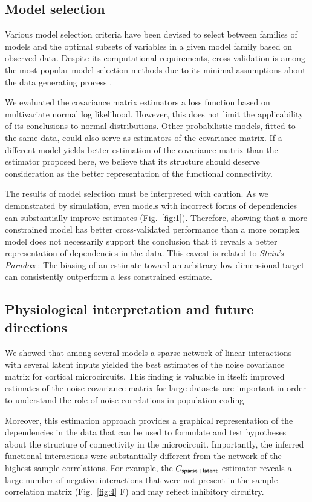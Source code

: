 \subsection*{Model selection}
Various model selection criteria have been devised to select between families of models and the optimal subsets of variables in a given model family based on observed data. Despite its computational requirements, cross-validation is among the most popular model selection methods due to its minimal assumptions about the data generating process \cite{Arlot:2010}.

We evaluated the covariance matrix estimators a loss function based on multivariate normal log likelihood.  However, this does not limit the applicability of its conclusions to normal distributions. Other probabilistic models, fitted to the same data, could also serve as estimators of the covariance matrix.  If a different model yields better estimation of the covariance matrix than the estimator proposed here, we believe that its structure should deserve consideration as the better representation of the functional connectivity.

The results of model selection must be interpreted with caution.  As we demonstrated by simulation, even models with incorrect forms of dependencies can substantially improve estimates (Fig.~\ref{fig:1}). Therefore, showing that a more constrained model has better cross-validated performance than a more complex model does not necessarily support the conclusion that it reveals a better representation of dependencies in the data.  This caveat is related to \emph{Stein's Paradox} \cite{Efron:1977}: The biasing of an estimate toward an arbitrary low-dimensional target can consistently outperform a less constrained estimate.

\subsection*{Physiological interpretation and future directions}

We showed that among several models a sparse network of linear interactions with several latent inputs yielded the best estimates of the noise covariance matrix for cortical microcircuits.  This finding is valuable in itself: improved estimates of the noise covariance matrix for large datasets are important in order to understand the role of noise correlations in population coding \cite{Abbott:1999, Sompolinsky:2001, Averbeck:2006, Ecker:2011}

Moreover, this estimation approach provides a graphical representation of the dependencies in the data that can be used to formulate and test hypotheses about the structure of connectivity in the microcircuit. Importantly, the inferred functional interactions were substantially different from the network of the highest sample correlations.  For example, the $C_{\sf sparse+latent}$ estimator reveals a large number of negative interactions that were not present in the sample correlation matrix (Fig.~\ref{fig:4} F) and may reflect inhibitory circuitry.

